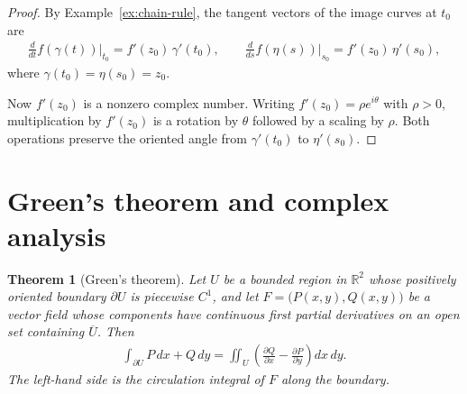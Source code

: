 \documentclass[11pt]{article}
\theoremstyle{plain}
\newtheorem{theorem}{Theorem}[section]
\theoremstyle{definition}
\theoremstyle{remark}
\numberwithin{equation}{section}
\newcommand{\be}{\begin{eqnarray}}
\newcommand{\ee}{\end{eqnarray}}
\newcommand{\R}{\mathbb{R}}
\begin{document}
\begin{proof}
By Example~\ref{ex:chain-rule}, the tangent vectors of the image curves at
$t_0$ are
\be
 \frac{d}{dt}f(\gamma(t))\Big|_{t_0}=f'(z_0)\,\gamma'(t_0),
 \qquad
 \frac{d}{ds}f(\eta(s))\Big|_{s_0}=f'(z_0)\,\eta'(s_0),
\ee
where $\gamma(t_0)=\eta(s_0)=z_0$.

\begin{center}
\end{center}

Now $f'(z_0)$ is a nonzero complex number. Writing
$f'(z_0)=\rho e^{i\theta}$ with $\rho>0$, multiplication by $f'(z_0)$ is a
rotation by $\theta$ followed by a scaling by $\rho$. Both operations
preserve the oriented angle from $\gamma'(t_0)$ to $\eta'(s_0)$.
\end{proof}

\section{Green's theorem and complex analysis}
\begin{theorem}[Green's theorem]
\label{thm:green}
Let $U$ be a bounded region in $\R^2$ whose positively oriented boundary
$\partial U$ is piecewise $C^1$, and let
$F=\bigl(P(x,y),Q(x,y)\bigr)$ be a vector field whose components have
continuous first partial derivatives on an open set containing $\overline U$.
Then
\be
 \int_{\partial U}P\,dx+Q\,dy
 =\iint_U\left(\frac{\partial Q}{\partial x}-\frac{\partial P}{\partial y}\right)dx\,dy.
\ee
The left-hand side is the circulation integral of $F$ along the boundary.
\end{theorem}

\begin{center}
\end{center}
\end{document}
